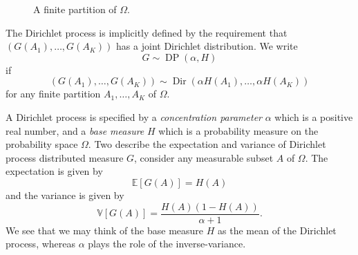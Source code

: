 \documentclass[final,3p,times,twocolumn]{elsarticle}
\DeclareMathOperator*{\Dir}{Dir}
\DeclareMathOperator*{\DP}{DP}
\begin{document}
\begin{figure}
\caption{A finite partition of $\Omega$.}
\label{fig:partition}
\end{figure}

The Dirichlet process is implicitly defined by the requirement that $(G(A_1), \dots, G(A_K))$ has a joint Dirichlet distribution.
We write 
\[G \sim \DP(\alpha,H)\]
if 
\begin{equation}
\label{eqn:dpdef}
(G(A_1),\dots,G(A_K)) \sim \Dir(\alpha H(A_1), \dots, \alpha H(A_K))
\end{equation}
for any finite partition $A_1,\dots,A_K$ of $\Omega$.

A Dirichlet process is specified by a \emph{concentration parameter} $\alpha$ which is a positive real number, and a \emph{base measure} $H$ which is a probability measure on the probability space $\Omega$.
Two describe the expectation and variance of Dirichlet process distributed measure $G$, consider any measurable subset $A$ of $\Omega$. 
The expectation is given by
\begin{equation}
\label{eqn:meandp}
\mathbb{E}\left[G(A)\right] = H(A)
\end{equation}
and the variance is given by
\begin{equation}
\label{eqn:vardp}
\mathbb{V}\left[G(A)\right] = \frac{H(A)(1-H(A))}{\alpha + 1}.
\end{equation}
We see that we may think of the base measure $H$ as the mean of the Dirichlet process, whereas $\alpha$ plays the role of the inverse-variance.
\end{document}
